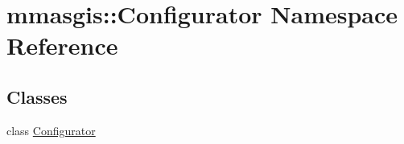 \hypertarget{namespacemmasgis_1_1Configurator}{
\section{mmasgis::Configurator Namespace Reference}
\label{namespacemmasgis_1_1Configurator}
}
\subsection*{Classes}
\begin{DoxyCompactItemize}
\item 
class \hyperlink{classmmasgis_1_1Configurator_1_1Configurator}{Configurator}
\end{DoxyCompactItemize}

